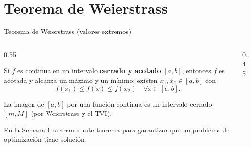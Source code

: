\documentclass[10pt,aspectratio=169]{beamer}
\begin{document}
\section{Teorema de Weierstrass}

\begin{frame}{Teorema de Weierstrass (valores extremos)}
  \begin{columns}
    \begin{column}{0.55\textwidth}
      \begin{teorema}[Weierstrass]
        Si $f$ es continua en un intervalo \textbf{cerrado y acotado} $[a,b]$, entonces $f$ es acotada y alcanza un máximo y un mínimo:
        existen $x_1,x_2\in[a,b]$ con
        \[ f(x_1)\le f(x)\le f(x_2)\quad\forall x\in[a,b]. \]
      \end{teorema}
      \begin{proposicion}[consecuencia]
        La imagen de $[a,b]$ por una función continua es un intervalo cerrado $[m,M]$ (por Weierstrass y el TVI).
      \end{proposicion}
      \small En la Semana 9 usaremos este teorema para garantizar que un problema de optimización tiene solución.
    \end{column}
    \begin{column}{0.45\textwidth}
      \centering
    \end{column}
  \end{columns}
\end{frame}
\end{document}
